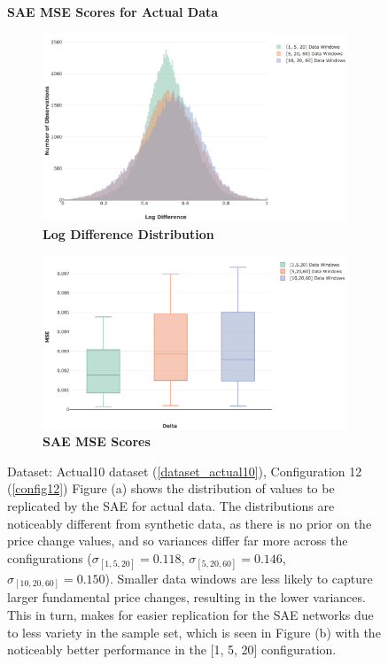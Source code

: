\documentclass[a4paper,11pt,oneside]{article}
\theoremstyle{plain}
\theoremstyle{definition}
\begin{document}
	\begin{figure}[H]
		\centering
		\textbf{SAE MSE Scores for Actual Data}
		\begin{subfigure}{.5\textwidth}
			\centering 
			\includegraphics[scale=0.25]{images/results/data/actual_aggregate_dist.png}
			\caption{\textbf{Log Difference Distribution}
				\newline }
			\label{figure-actual_aggregate_dist}
		\end{subfigure}%
		\begin{subfigure}{.5\textwidth}
			\centering 
			\includegraphics[scale=0.26]{images/results/data/actual_aggregation_mse.png}
			\caption{\textbf{SAE MSE Scores} 
				\newline }
			\label{figure-actual_aggregation_mse}
		\end{subfigure}
		\caption[SAE MSE Scores for Actual Data]{Dataset: Actual10 dataset (\ref{dataset_actual10}), Configuration 12 (\ref{config12})
			\newline Figure (a) shows the distribution of values to be replicated by the SAE for actual data. The distributions are noticeably different from synthetic data, as there is no prior on the price change values, and so variances differ far more across the configurations ($\sigma_{[1,5,20]} = 0.118$, $\sigma_{[5,20,60]} = 0.146$, $\sigma_{[10,20,60]} = 0.150$). Smaller data windows are less likely to capture larger fundamental price changes, resulting in the lower variances. This in turn, makes for easier replication for the SAE networks due to less variety in the sample set, which is seen in Figure (b) with the noticeably better performance in the [1, 5, 20] configuration.   }
		\label{fig:data_sae_actual}
	\end{figure}
	
\end{document}
